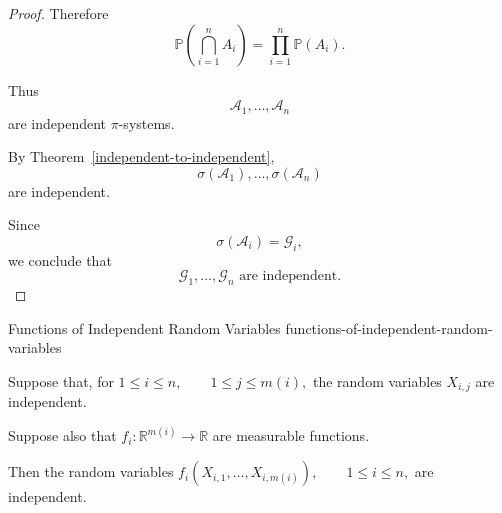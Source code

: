 \begin{proof}
Therefore
\[
\mathbb{P}\left(
\bigcap_{i=1}^{n}A_i
\right)
=
\prod_{i=1}^{n}\mathbb{P}(A_i).
\]

Thus
\[
\mathcal{A}_1,\ldots,\mathcal{A}_n
\]
are independent $\pi$-systems.

By Theorem~\ref{independent-to-independent},
\[
\sigma(\mathcal{A}_1),\ldots,\sigma(\mathcal{A}_n)
\]
are independent.

Since
\[
\sigma(\mathcal{A}_i)=\mathcal{G}_i,
\]
we conclude that
\[
\boxed{
\mathcal{G}_1,\ldots,\mathcal{G}_n
\text{ are independent}.
}
\]

\end{proof}



\begin{theorem}{Functions of Independent Random Variables}
{functions-of-independent-random-variables}

Suppose that, for
\(
1\leq i\leq n,
\qquad
1\leq j\leq m(i),
\)
the random variables
\(
X_{i,j}
\)
are independent.

Suppose also that
\(
f_i:\mathbb{R}^{m(i)}\to\mathbb{R}
\)
are measurable functions.

Then the random variables
\(
f_i(X_{i,1},\ldots,X_{i,m(i)}),
\qquad
1\leq i\leq n,
\)
are independent.

\end{theorem}

